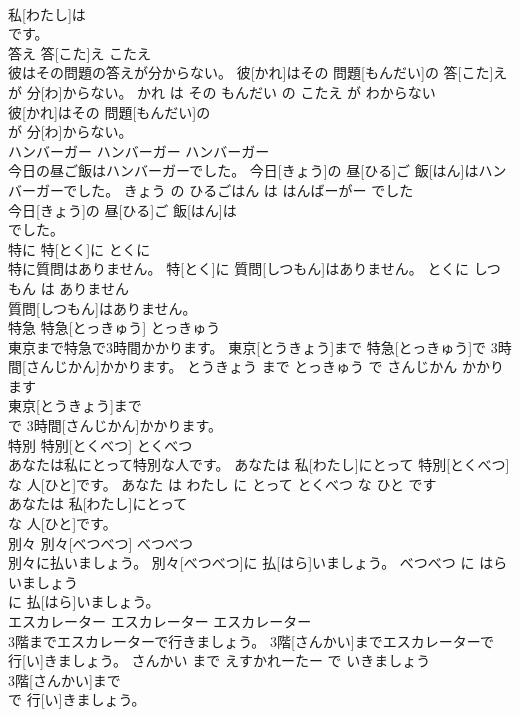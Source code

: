 \documentclass[8pt]{extreport}
\begin{document}
\begin{CJK}{UTF8}{min}
\\	私[わたし]は
\\	です。			
\\	答え	答[こた]え	こたえ	
\\	彼はその問題の答えが分からない。	彼[かれ]はその 問題[もんだい]の 答[こた]えが 分[わ]からない。	かれ は その もんだい の こたえ が わからない	
\\	彼[かれ]はその 問題[もんだい]の
\\	が 分[わ]からない。			
\\	ハンバーガー	ハンバーガー	ハンバーガー	
\\	今日の昼ご飯はハンバーガーでした。	今日[きょう]の 昼[ひる]ご 飯[はん]はハンバーガーでした。	きょう の ひるごはん は はんばーがー でした	
\\	今日[きょう]の 昼[ひる]ご 飯[はん]は
\\	でした。			
\\	特に	特[とく]に	とくに	
\\	特に質問はありません。	特[とく]に 質問[しつもん]はありません。	とくに しつもん は ありません	
\\	質問[しつもん]はありません。			
\\	特急	特急[とっきゅう]	とっきゅう	
\\	東京まで特急で3時間かかります。	東京[とうきょう]まで 特急[とっきゅう]で 3時間[さんじかん]かかります。	とうきょう まで とっきゅう で さんじかん かかります	
\\	東京[とうきょう]まで
\\	で 3時間[さんじかん]かかります。			
\\	特別	特別[とくべつ]	とくべつ	
\\	あなたは私にとって特別な人です。	あなたは 私[わたし]にとって 特別[とくべつ]な 人[ひと]です。	あなた は わたし に とって とくべつ な ひと です	
\\	あなたは 私[わたし]にとって
\\	な 人[ひと]です。			
\\	別々	別々[べつべつ]	べつべつ	
\\	別々に払いましょう。	別々[べつべつ]に 払[はら]いましょう。	べつべつ に はらいましょう	
\\	に 払[はら]いましょう。			
\\	エスカレーター	エスカレーター	エスカレーター	
\\	3階までエスカレーターで行きましょう。	3階[さんかい]までエスカレーターで 行[い]きましょう。	さんかい まで えすかれーたー で いきましょう	
\\	3階[さんかい]まで
\\	で 行[い]きましょう。			

\end{CJK}
\end{document}
